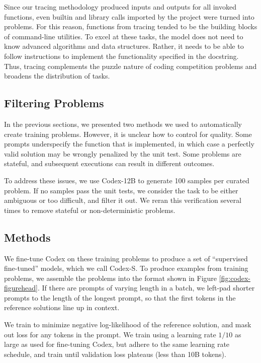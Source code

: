 Since our tracing methodology produced inputs and outputs for all invoked functions, even builtin and library calls imported by the project were turned into problems. For this reason, functions from tracing tended to be the building blocks of command-line utilities. To excel at these tasks, the model does not need to know advanced algorithms and data structures. Rather, it needs to be able to follow instructions to implement the functionality specified in the docstring. Thus, tracing complements the puzzle nature of coding competition problems and broadens the distribution of tasks.

\subsection{Filtering Problems}
\label{sec:sup:filtering}

In the previous sections, we presented two methods we used to automatically create training problems. However, it is unclear how to control for quality. Some prompts underspecify the function that is implemented, in which case a perfectly valid solution may be wrongly penalized by the unit test. Some problems are stateful, and subsequent executions can result in different outcomes.

To address these issues, we use Codex-12B to generate 100 samples per curated problem. If no samples pass the unit tests, we consider the task to be either ambiguous or too difficult, and filter it out. We reran this verification several times to remove stateful or non-deterministic problems.

\subsection{Methods}
\label{sec:sup:methods}

We fine-tune Codex on these training problems to produce a set of ``supervised fine-tuned'' models, which we call Codex-S. To produce examples from training problems, we assemble the problems into the format shown in Figure \ref{fig:codex-figurehead}. If there are prompts of varying length in a batch, we left-pad shorter prompts to the length of the longest prompt, so that the first tokens in the reference solutions line up in context.

We train to minimize negative log-likelihood of the reference solution, and mask out loss for any tokens in the prompt. We train using a learning rate $1/10$ as large as used for fine-tuning Codex, but adhere to the same learning rate schedule, and train until validation loss plateaus (less than 10B tokens).

